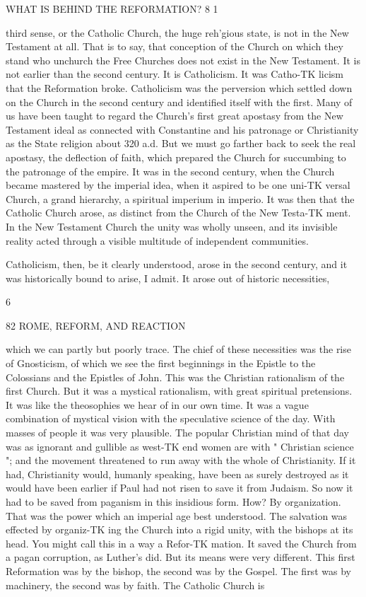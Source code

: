 \documentclass[12pt,a5paper,oneside]{book}
\begin{document}
WHAT IS BEHIND THE REFORMATION? 8 1 

third sense, or the Catholic Church, the huge reh'gious 
state, is not in the New Testament at all. That is 
to say, that conception of the Church on which they 
stand who unchurch the Free Churches does not exist 
in the New Testament. It is not earlier than the 
second century. It is Catholicism. It was Catho-TK
licism that the Reformation broke. Catholicism was the 
perversion which settled down on the Church in the 
second century and identified itself with the first. 
Many of us have been taught to regard the Church's 
first great apostasy from the New Testament ideal as 
connected with Constantine and his patronage or 
Christianity as the State religion about 320 a.d. But 
we must go farther back to seek the real apostasy, 
the deflection of faith, which prepared the Church for 
succumbing to the patronage of the empire. It was in 
the second century, when the Church became mastered 
by the imperial idea, when it aspired to be one uni-TK
versal Church, a grand hierarchy, a spiritual imperium 
in imperio. It was then that the Catholic Church 
arose, as distinct from the Church of the New Testa-TK
ment. In the New Testament Church the unity was 
wholly unseen, and its invisible reality acted through 
a visible multitude of independent communities. 

Catholicism, then, be it clearly understood, arose 
in the second century, and it was historically bound 
to arise, I admit. It arose out of historic necessities, 

6 



82 ROME, REFORM, AND REACTION 

which we can partly but poorly trace. The chief of 
these necessities was the rise of Gnosticism, of which 
we see the first beginnings in the Epistle to the 
Colossians and the Epistles of John. This was the 
Christian rationalism of the first Church. But it was 
a mystical rationalism, with great spiritual pretensions. 
It was like the theosophies we hear of in our own 
time. It was a vague combination of mystical vision 
with the speculative science of the day. With masses 
of people it was very plausible. The popular Christian 
mind of that day was as ignorant and gullible as west-TK
end women are with " Christian science "; and the 
movement threatened to run away with the whole of 
Christianity. If it had, Christianity would, humanly 
speaking, have been as surely destroyed as it would 
have been earlier if Paul had not risen to save it from 
Judaism. So now it had to be saved from paganism 
in this insidious form. How? By organization. 
That was the power which an imperial age best 
understood. The salvation was effected by organiz-TK
ing the Church into a rigid unity, with the bishops 
at its head. You might call this in a way a Refor-TK
mation. It saved the Church from a pagan corruption, 
as Luther's did. But its means were very different. 
This first Reformation was by the bishop, the second 
was by the Gospel. The first was by machinery, 
the second was by faith. The Catholic Church is 
\end{document}
